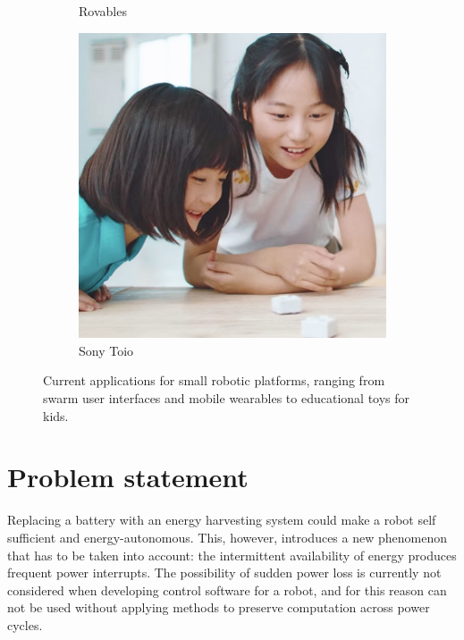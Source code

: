 \begin{figure}
\begin{subfigure}[b]{0.324\textwidth}
		\caption{Rovables~\cite{dementyev_uist_2016}}
		\label{fig:int_roverables}
	\end{subfigure}
	\begin{subfigure}[b]{0.323\textwidth}
		\includegraphics[width=\textwidth]{pics/toio.jpg}
		\caption{Sony Toio~\cite{sony_toio_2017}}
		\label{fig:int_toio}
	\end{subfigure}
	\caption{Current applications for small robotic platforms, ranging from swarm user interfaces and mobile wearables to educational toys for kids.}
	\label{fig:int_example_sui}
\end{figure}

\section{Problem statement}




Replacing a battery with an energy harvesting system could make a robot self sufficient and energy-autonomous. 
This, however, introduces a new phenomenon that has to be taken into account: the intermittent availability of energy produces frequent power interrupts.
The possibility of sudden power loss is currently not considered when developing control software for a robot, and for this reason can not be used without applying methods to preserve computation across power cycles.%

